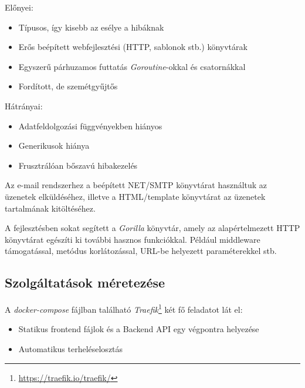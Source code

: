 \begin{samepage}
      \noindent Előnyei:
      \begin{itemize}
            \item Típusos, így kisebb az esélye a hibáknak
            \item Erős beépített webfejlesztési (HTTP, sablonok stb.) könyvtárak
            \item Egyszerű párhuzamos futtatás \emph{Goroutine}-okkal és csatornákkal
            \item Fordított, de szemétgyűjtős

      \end{itemize}
\end{samepage}

\begin{samepage}
      \noindent Hátrányai:
      \begin{itemize}
            \item Adatfeldolgozási függvényekben hiányos
            \item Generikusok hiánya
            \item Frusztrálóan bőszavú hibakezelés
      \end{itemize}
\end{samepage}

Az e-mail rendszerhez a beépített NET/SMTP könyvtárat használtuk az üzenetek elküldéséhez, illetve a HTML/template könyvtárat az üzenetek tartalmának kitöltéséhez.

A fejlesztésben sokat segített a \emph{Gorilla} könyvtár, amely az alapértelmezett HTTP könyvtárat egészíti ki további hasznos funkciókkal.
Például middleware támogatással, metódus korlátozással, URL-be helyezett paraméterekkel stb.

\subsection{Szolgáltatások méretezése}
A \emph{docker-compose} fájlban található \emph{Traefik}\footnote{\url{https://traefik.io/traefik/}} két fő feladatot lát el:

\begin{samepage}
      \begin{itemize}
            \item Statikus frontend fájlok és a Backend API egy végpontra helyezése
            \item Automatikus terheléselosztás
      \end{itemize}
\end{samepage}

